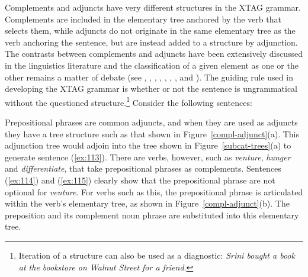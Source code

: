 Complements and adjuncts have very different structures in the XTAG grammar. 
Complements are included in the elementary tree anchored by the verb that 
selects them, while adjuncts do not originate in the same elementary tree as 
the verb anchoring the sentence, but are instead added to a structure by 
adjunction.  The contrasts between complements and adjuncts have been 
extensively discussed in the linguistics literature and the classification of a 
given element as one or the other remains a matter of debate (see 
\cite{rizzi90}, 
\cite{larson88}, \cite{jackendoff90}, \cite{larson90}, \cite{cinque90}, 
\cite{obernauer84}, \cite{lasnik-saito84}, and \cite{chomsky86}).  The guiding 
rule used in developing the XTAG grammar is whether or not the sentence is 
ungrammatical without the questioned structure.\footnote{Iteration of a structure can also be used as a diagnostic: {\it Srini bought a book at the bookstore on Walnut Street for a friend}.} Consider the following 
sentences: 
 
\beginsentences
{}\label{ex:112} 
\label{ex:113} 
\label{ex:114} 
\label{ex:115} 
\endsentences

 
Prepositional phrases are common adjuncts, and when they are used as 
adjuncts they have a tree structure such as that shown in 
Figure~\ref{compl-adjunct}(a).  This adjunction tree would adjoin into 
the tree shown in Figure~\ref{subcat-trees}(a) to generate sentence 
(\ref{ex:113}).  There are verbs, however, such as {\it venture}, {\it hunger} and {\it differentiate}, that take prepositional phrases as 
complements.  Sentences (\ref{ex:114}) and (\ref{ex:115}) clearly show that the 
prepositional phrase are not optional for {\it venture}. 
For verbs such as this, the prepositional phrase is articulated within the 
verb's elementary tree, as shown in Figure~\ref{compl-adjunct}(b). The 
preposition and its complement noun phrase are substituted into this elementary 
tree. 
 
